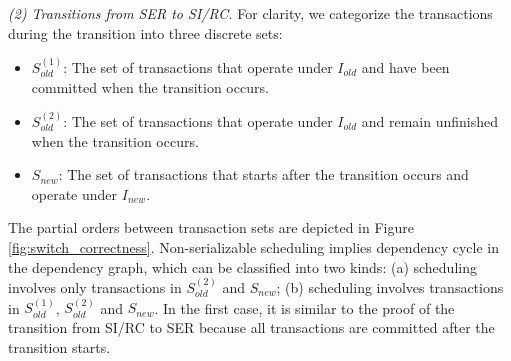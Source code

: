 
\textit{(2) Transitions from SER to SI/RC. } 
For clarity, we categorize the transactions during the transition into three discrete sets:
\begin{itemize}[leftmargin=*]
    \item $S_{old}^{(1)}$: The set of transactions that operate under $I_{old}$ and have been committed when the transition occurs. 
    \item $S_{old}^{(2)}$: The set of transactions that operate under $I_{old}$ and remain unfinished when the transition occurs. 
    \item $S_{new}$: The set of transactions that starts after the transition occurs and operate under $I_{new}$.
\end{itemize} 

The partial orders between transaction sets are depicted in Figure \ref{fig:switch_correctness}. 
Non-serializable scheduling implies dependency cycle in the dependency graph, which can be classified into two kinds: (a) scheduling involves only transactions in $S_{old}^{(2)}$ and $S_{new}$; (b) scheduling involves transactions in $S_{old}^{(1)}$, $S_{old}^{(2)}$ and $S_{new}$. In the first case, it is similar to the proof of the transition from SI/RC to SER because all transactions are committed after the transition starts. 

